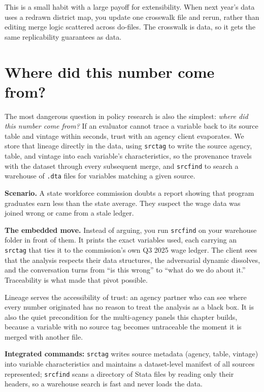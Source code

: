 \documentclass[
    a4paper,
    fontsize=10pt,
    twoside=true,
    numbers=noenddot,
]{kaobook}
\newcounter{appliedexample}
\newenvironment{appliedexample}[1][]{%
    \refstepcounter{appliedexample}%
    \begin{appliedexamplebox}[frametitle={Applied Example~\theappliedexample.~~#1}]%
}{%
    \end{appliedexamplebox}%
}
\begin{document}
This is a small habit with a large payoff for extensibility. When next year's data uses a redrawn district map, you update one crosswalk file and rerun, rather than editing merge logic scattered across do-files. The crosswalk is data, so it gets the same replicability guarantees as data.

\section{Where did this number come from?}\label{sec:lineage}
The most dangerous question in policy research is also the simplest: \emph{where did this number come from?} If an evaluator cannot trace a variable back to its source table and vintage within seconds, trust with an agency client evaporates. We store that lineage directly in the data, using \texttt{srctag} to write the source agency, table, and vintage into each variable's characteristics, so the provenance travels with the dataset through every subsequent merge, and \texttt{srcfind} to search a warehouse of \texttt{.dta} files for variables matching a given source.

\begin{appliedexample}[Proving lineage to a skeptical agency]
\textbf{Scenario.} A state workforce commission doubts a report showing that program graduates earn less than the state average. They suspect the wage data was joined wrong or came from a stale ledger.

\medskip
\textbf{The embedded move.} Instead of arguing, you run \texttt{srcfind} on your warehouse folder in front of them. It prints the exact variables used, each carrying an \texttt{srctag} that ties it to the commission's own Q3 2025 wage ledger. The client sees that the analysis respects their data structures, the adversarial dynamic dissolves, and the conversation turns from \enquote{is this wrong} to \enquote{what do we do about it.} Traceability is what made that pivot possible.
\end{appliedexample}

Lineage serves the accessibility of trust: an agency partner who can see where every number originated has no reason to treat the analysis as a black box. It is also the quiet precondition for the multi-agency panels this chapter builds, because a variable with no source tag becomes untraceable the moment it is merged with another file.

\begin{kaobox}[frametitle=Package Integration: \texttt{srctag} and \texttt{srcfind}]
\textbf{Integrated commands:} \texttt{srctag} writes source metadata (agency, table, vintage) into variable characteristics and maintains a dataset-level manifest of all sources represented; \texttt{srcfind} scans a directory of Stata files by reading only their headers, so a warehouse search is fast and never loads the data.
\end{kaobox}
\end{document}
